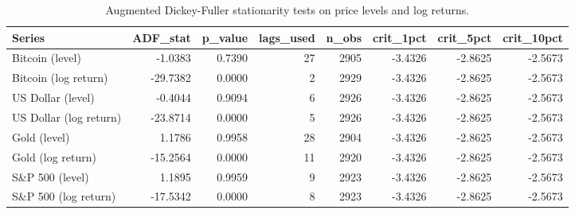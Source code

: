 \begin{table}
\caption{Augmented Dickey-Fuller stationarity tests on price levels and log returns.}
\label{tab:adf}
\begin{tabular}{lrrrrrrr}
\toprule
Series & ADF\_stat & p\_value & lags\_used & n\_obs & crit\_1pct & crit\_5pct & crit\_10pct \\
\midrule
Bitcoin (level) & -1.0383 & 0.7390 & 27 & 2905 & -3.4326 & -2.8625 & -2.5673 \\
Bitcoin (log return) & -29.7382 & 0.0000 & 2 & 2929 & -3.4326 & -2.8625 & -2.5673 \\
US Dollar (level) & -0.4044 & 0.9094 & 6 & 2926 & -3.4326 & -2.8625 & -2.5673 \\
US Dollar (log return) & -23.8714 & 0.0000 & 5 & 2926 & -3.4326 & -2.8625 & -2.5673 \\
Gold (level) & 1.1786 & 0.9958 & 28 & 2904 & -3.4326 & -2.8625 & -2.5673 \\
Gold (log return) & -15.2564 & 0.0000 & 11 & 2920 & -3.4326 & -2.8625 & -2.5673 \\
S\&P 500 (level) & 1.1895 & 0.9959 & 9 & 2923 & -3.4326 & -2.8625 & -2.5673 \\
S\&P 500 (log return) & -17.5342 & 0.0000 & 8 & 2923 & -3.4326 & -2.8625 & -2.5673 \\
\bottomrule
\end{tabular}
\end{table}
